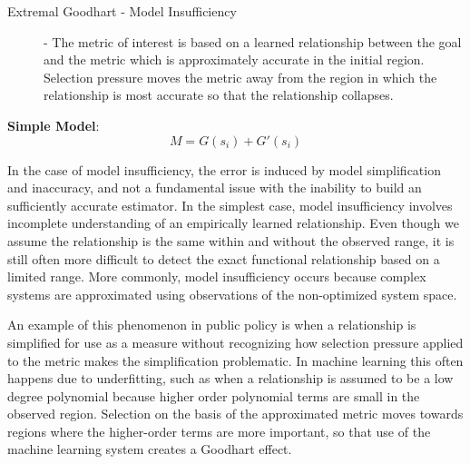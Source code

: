\documentclass[10pt]{article}
\begin{document}
\begin{description}
\item[Extremal Goodhart - Model Insufficiency] - The metric of interest is based on a learned relationship between the goal and the metric which is approximately accurate in the initial region. Selection pressure moves the metric away from the region in which the relationship is most accurate so that the relationship collapses. %
\end{description} 
\textbf{Simple Model}:  \begin{equation} M = G(s_i)+ G'(s_i)  \end{equation}

In the case of model insufficiency, the error is induced by model simplification and inaccuracy, and not a fundamental issue with the inability to build an sufficiently accurate estimator. In the simplest case, model insufficiency involves incomplete understanding of an empirically learned relationship. Even though we assume the relationship is the same within and without the observed range, it is still often more difficult to detect the exact functional relationship based on a limited range. More commonly, model insufficiency occurs because complex systems are approximated using observations of the non-optimized system space.

An example of this phenomenon in public policy is when a relationship is simplified for use as a measure without recognizing how selection pressure applied to the metric makes the simplification problematic. In machine learning this often happens due to underfitting, such as when a relationship is assumed to be a low degree polynomial because higher order polynomial terms are small in the observed region. Selection on the basis of the approximated metric moves towards regions where the higher-order terms are more important, so that use of the machine learning system creates a Goodhart effect.
\end{document}
